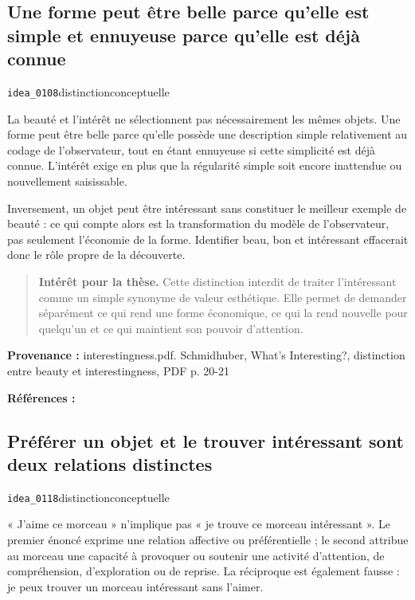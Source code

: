 \documentclass[10pt,a4paper]{article}
\begin{document}
\subsection{Une forme peut être belle parce qu'elle est simple et ennuyeuse parce qu'elle est déjà connue}
{\small\color{metadata} \texttt{idea\_0108}\quad\textbullet\quad distinction\quad\textbullet\quad conceptuelle\par}

La beauté et l'intérêt ne sélectionnent pas nécessairement les mêmes objets. Une forme peut être belle parce qu'elle possède une description simple relativement au codage de l'observateur, tout en étant ennuyeuse si cette simplicité est déjà connue. L'intérêt exige en plus que la régularité simple soit encore inattendue ou nouvellement saisissable.

Inversement, un objet peut être intéressant sans constituer le meilleur exemple de beauté : ce qui compte alors est la transformation du modèle de l'observateur, pas seulement l'économie de la forme. Identifier beau, bon et intéressant effacerait donc le rôle propre de la découverte.

\begin{quote}
\textbf{Intérêt pour la thèse.} Cette distinction interdit de traiter l'intéressant comme un simple synonyme de valeur esthétique. Elle permet de demander séparément ce qui rend une forme économique, ce qui la rend nouvelle pour quelqu'un et ce qui maintient son pouvoir d'attention.
\end{quote}
{\footnotesize\color{metadata}\textbf{Provenance :} interestingness.pdf. Schmidhuber, What's Interesting?, distinction entre beauty et interestingness, PDF p. 20-21\par}
{\footnotesize\color{metadata}\textbf{Références :} \parencite{schmidhuber1997interesting}\par}

\subsection{Préférer un objet et le trouver intéressant sont deux relations distinctes}
{\small\color{metadata} \texttt{idea\_0118}\quad\textbullet\quad distinction\quad\textbullet\quad conceptuelle\par}

« J'aime ce morceau » n'implique pas « je trouve ce morceau intéressant ». Le premier énoncé exprime une relation affective ou préférentielle ; le second attribue au morceau une capacité à provoquer ou soutenir une activité d'attention, de compréhension, d'exploration ou de reprise. La réciproque est également fausse : je peux trouver un morceau intéressant sans l'aimer.
\end{document}
